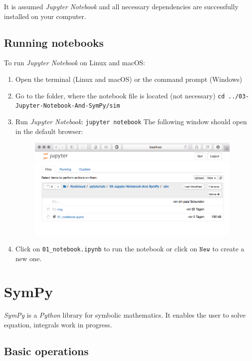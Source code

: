 \documentclass[a4paper,11pt,headings=standardclasses,parskip=half]{scrartcl}
\newcommand{\py}{\emph{Python}\xspace}
\newcommand{\jp}{\emph{Jupyter Notebook}\xspace}
\newcommand{\sympy}{\emph{SymPy}\xspace}
\begin{document}
It is assumed \jp and all necessary dependencies are successfully installed on your computer.
\subsection{Running notebooks}
To run \jp on Linux and macOS:
\begin{enumerate}
\item Open the terminal (Linux and macOS) or the command prompt (Windows)
\item Go to the folder, where the notebook file is located (not necessary)
	\subitem \texttt{cd ../03-Jupyter-Notebook-And-SymPy/sim}
\item Run \jp: 
	\subitem \texttt{jupyter notebook}
	\subitem The following window should open in the default browser:
\begin{figure}[htb]
\centering
\includegraphics[scale=0.4]{img/jupyter_screenshot}
\end{figure}
\item Click on \texttt{01\_notebook.ipynb} to run the notebook or click on $\texttt{New}$ to create a new one.
\end{enumerate}  
\newpage
\section{SymPy}
\sympy is a \py library for symbolic mathematics. It enables the user to solve equation, integrals work in progress.
\subsection{Basic operations}
\end{document}
